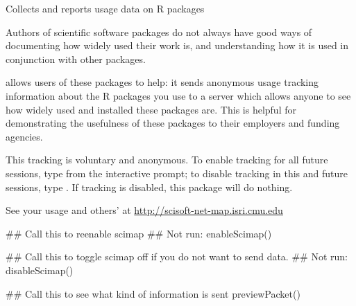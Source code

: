 \documentclass[letterpaper]{book}
\begin{document}
%
\begin{Description}\relax
Collects and reports usage data on R packages
\end{Description}
%
\begin{Details}\relax
Authors of scientific software packages do not always have
good ways of documenting how widely used their work is, and
understanding how it is used in conjunction with other packages.

 allows users of these packages to help:
it sends anonymous usage tracking information about the R packages
you use to a server which allows anyone to see how
widely used and installed these packages are.  This is helpful
for demonstrating the usefulness of these packages to
their employers and funding agencies.

This tracking is voluntary and anonymous.  To enable tracking
for all future sessions, type  from the
interactive prompt; to disable tracking in this and future
sessions, type .  If tracking is disabled, this
package will do nothing.
\end{Details}
%
\begin{References}\relax
See your usage and others' at \url{http://scisoft-net-map.isri.cmu.edu}
\end{References}
%
\begin{Examples}
\begin{ExampleCode}
##  Call this to reenable scimap
## Not run: enableScimap()

##  Call this to toggle scimap off if you do not want to send data.
## Not run: disableScimap()

## Call this to see what kind of information is sent
previewPacket()
\end{ExampleCode}
\end{Examples}
\printindex{}
\end{document}
